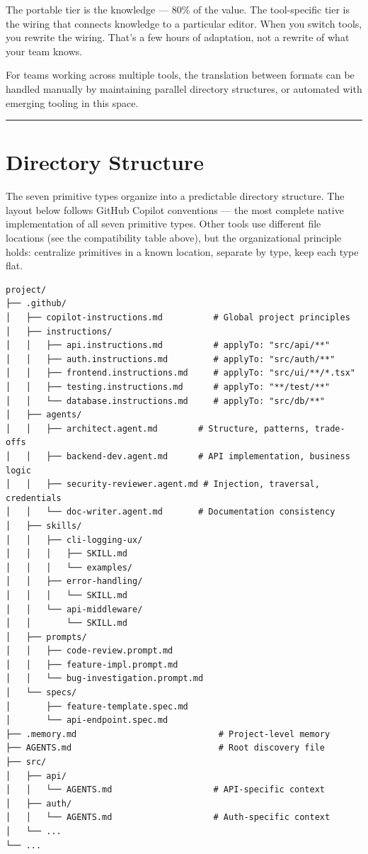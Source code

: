 \documentclass[
  a4paper,
  DIV=11,
  numbers=noendperiod]{scrreprt}
\begin{document}
The portable tier is the knowledge --- 80\% of the value. The
tool-specific tier is the wiring that connects knowledge to a particular
editor. When you switch tools, you rewrite the wiring. That's a few
hours of adaptation, not a rewrite of what your team knows.

For teams working across multiple tools, the translation between formats
can be handled manually by maintaining parallel directory structures, or
automated with emerging tooling in this space.

\begin{center}\rule{0.5\linewidth}{0.5pt}\end{center}

\section{Directory Structure}\label{directory-structure}

The seven primitive types organize into a predictable directory
structure. The layout below follows GitHub Copilot conventions --- the
most complete native implementation of all seven primitive types. Other
tools use different file locations (see the compatibility table above),
but the organizational principle holds: centralize primitives in a known
location, separate by type, keep each type flat.

\begin{verbatim}
project/
├── .github/
│   ├── copilot-instructions.md          # Global project principles
│   ├── instructions/
│   │   ├── api.instructions.md          # applyTo: "src/api/**"
│   │   ├── auth.instructions.md         # applyTo: "src/auth/**"
│   │   ├── frontend.instructions.md     # applyTo: "src/ui/**/*.tsx"
│   │   ├── testing.instructions.md      # applyTo: "**/test/**"
│   │   └── database.instructions.md     # applyTo: "src/db/**"
│   ├── agents/
│   │   ├── architect.agent.md        # Structure, patterns, trade-offs
│   │   ├── backend-dev.agent.md      # API implementation, business logic
│   │   ├── security-reviewer.agent.md # Injection, traversal, credentials
│   │   └── doc-writer.agent.md       # Documentation consistency
│   ├── skills/
│   │   ├── cli-logging-ux/
│   │   │   ├── SKILL.md
│   │   │   └── examples/
│   │   ├── error-handling/
│   │   │   └── SKILL.md
│   │   └── api-middleware/
│   │       └── SKILL.md
│   ├── prompts/
│   │   ├── code-review.prompt.md
│   │   ├── feature-impl.prompt.md
│   │   └── bug-investigation.prompt.md
│   └── specs/
│       ├── feature-template.spec.md
│       └── api-endpoint.spec.md
├── .memory.md                            # Project-level memory
├── AGENTS.md                             # Root discovery file
├── src/
│   ├── api/
│   │   └── AGENTS.md                    # API-specific context
│   ├── auth/
│   │   └── AGENTS.md                    # Auth-specific context
│   └── ...
└── ...
\end{verbatim}
\end{document}
